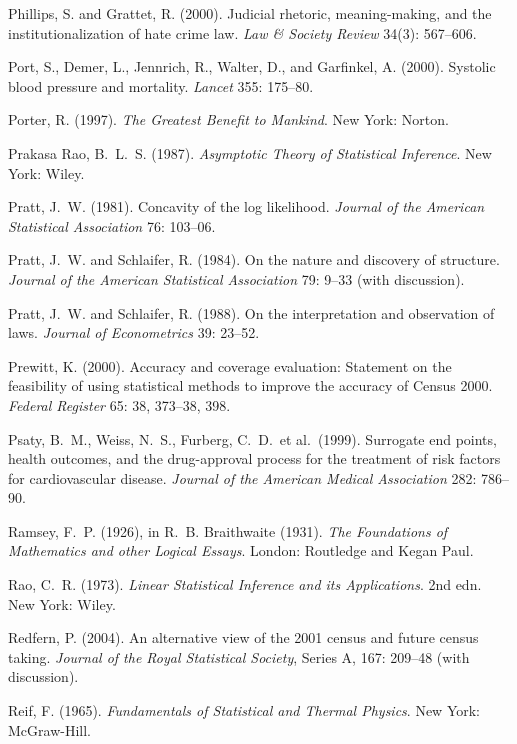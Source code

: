 \smallskip\noindent
Phillips, S. and Grattet, R. (2000).
Judicial rhetoric, meaning-making, and the institutionalization of hate crime law.
{\it Law \& Society Review} 34(3): 567--606.

\smallskip\noindent
Port, S., Demer, L., Jennrich, R., Walter, D., and Garfinkel, A. (2000).
Systolic blood pressure and mortality.
{\it Lancet\/} 355: 175--80.

\smallskip\noindent
Porter, R. (1997).
{\it The Greatest Benefit to Mankind\/}.
New York: Norton. %

\smallskip\noindent
Prakasa Rao, B.~L.~S. (1987).
{\it  Asymptotic Theory of Statistical Inference\/}.
New York: Wiley.

\smallskip\noindent
Pratt, J.~W. (1981).
Concavity of the log likelihood.
{\it Journal of the American Statistical Association\/} {76}: 103--06.

\smallskip\noindent
Pratt, J.~W. and Schlaifer, R. (1984).
On the nature and discovery of structure.
{\it Journal of the American Statistical Association\/} 79: 9--33 (with discussion).

\smallskip\noindent
Pratt, J.~W. and Schlaifer, R. (1988).
On the interpretation and observation of laws.
{\it Journal of Econometrics\/} 39: 23--52.

\smallskip\noindent
Prewitt, K. (2000).
Accuracy and coverage evaluation:
Statement on the feasibility of using statistical methods to improve the accuracy of Census 2000.
{\it Federal Register\/} 65: 38, 373--38, 398.

\smallskip\noindent
Psaty, B.~M., Weiss, N.~S., Furberg, C.~D.~et al.~(1999).
Surrogate end points, health outcomes, and the drug-approval process
for the treatment of risk factors for cardiovascular disease.
{\it Journal of the American Medical Association\/} 282: 786--90.

\smallskip\noindent
Ramsey, F.~P. (1926), in R.~B. Braithwaite (1931).
{\it  The Foundations of Mathematics and other Logical Essays\/}.
London: Routledge and Kegan Paul.

\smallskip\noindent
Rao, C.~R. (1973).
{\it Linear Statistical Inference and its Applications}. 2nd edn.
New York: Wiley.

\smallskip\noindent
Redfern, P. (2004).
An alternative view of the 2001 census and future census taking.
{\it Journal of the Royal Statistical Society\/},
Series A, 167: 209--48 (with discussion).

\smallskip\noindent
Reif, F. (1965).
{\it Fundamentals of Statistical and Thermal Physics\/}.
New York: McGraw-Hill.

